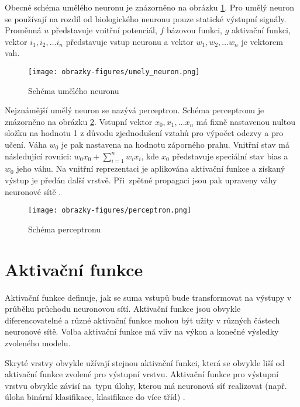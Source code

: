 Obecné schéma umělého neuronu je znázorněno na obrázku \ref{fig:umelyneuron}. Pro umělý neuron se používají na rozdíl od biologického neuronu pouze statické výstupní signály. Proměnná $u$ představuje vnitřní potenciál, $f$ bázovou funkci, $g$ aktivační funkci, vektor $i_1, i_2,\ldots i_n$ představuje vstup neuronu a vektor $w_1, w_2,\ldots w_n$ je vektorem vah. 

\begin{figure}[!htbp]
    \centering
    \texttt{[image: obrazky-figures/umely\_neuron.png]}
    \caption{Schéma umělého neuronu \cite{IZULecture}}
    \label{fig:umelyneuron}
\end{figure}


Nejznámější umělý neuron se nazývá perceptron. Schéma perceptronu je znázorněno na obrázku \ref{fig:perceptron}. Vstupní vektor $x_0, x_1,\ldots x_n$ má fixně nastavenou nultou složku na hodnotu 1 z důvodu zjednodušení vztahů pro výpočet odezvy a pro učení. Váha $w_0$ je pak nastavena na hodnotu záporného prahu. Vnitřní stav má následující rovnici: $w_0x_0 + \sum_{i=1}^{n}w_ix_i$, kde $x_0$ představuje speciální stav bias a $w_0$ jeho váhu. Na vnitřní reprezentaci je aplikována aktivační funkce a získaný výstup je předán další vrstvě. Při~zpětné propagaci jsou pak upraveny váhy neuronové sítě \cite{IZULecture}.

\begin{figure}[!htbp]
    \centering
    \texttt{[image: obrazky-figures/perceptron.png]}
    \caption{Schéma perceptronu \cite{IZULecture}}
    \label{fig:perceptron}
\end{figure}


\section{Aktivační funkce}
Aktivační funkce definuje, jak se suma vstupů bude transformovat na výstupy v průběhu průchodu neuronovou sítí. Aktivační funkce jsou obvykle diferencovatelné a různé aktivační funkce mohou být užity v různých částech neuronové sítě. Volba aktivační funkce má vliv na výkon a konečné výsledky zvoleného modelu. 

Skryté vrstvy obvykle užívají stejnou aktivační funkci, která se obvykle liší od aktivační funkce zvolené pro výstupní vrstvu. Aktivační funkce pro výstupní vrstvu obvykle závisí na~typu úlohy, kterou má neuronová síť realizovat (např. úloha binární klasifikace, klasifikace do více tříd) \cite{HowToChooseActivationFunction}.

